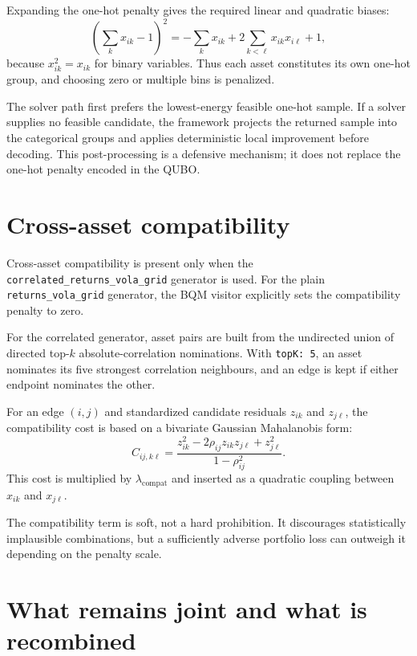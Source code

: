 \documentclass[11pt,a4paper]{article}
\begin{document}
Expanding the one-hot penalty gives the required linear and quadratic biases:
\begin{equation}
 \left(\sum_k x_{ik}-1\right)^2
 =-\sum_k x_{ik}+2\sum_{k<\ell}x_{ik}x_{i\ell}+1,
\end{equation}
because $x_{ik}^2=x_{ik}$ for binary variables. Thus each asset constitutes its
own one-hot group, and choosing zero or multiple bins is penalized.

The solver path first prefers the lowest-energy feasible one-hot sample. If a
solver supplies no feasible candidate, the framework projects the returned
sample into the categorical groups and applies deterministic local improvement
before decoding. This post-processing is a defensive mechanism; it does not
replace the one-hot penalty encoded in the QUBO.

\section{Cross-asset compatibility}

Cross-asset compatibility is present only when the
\texttt{correlated\_returns\_vola\_grid} generator is used. For the plain
\texttt{returns\_vola\_grid} generator, the BQM visitor explicitly sets the
compatibility penalty to zero.

For the correlated generator, asset pairs are built from the undirected union
of directed top-$k$ absolute-correlation nominations. With \texttt{topK: 5}, an
asset nominates its five strongest correlation neighbours, and an edge is kept
if either endpoint nominates the other.

For an edge $(i,j)$ and standardized candidate residuals $z_{ik}$ and
$z_{j\ell}$, the compatibility cost is based on a bivariate Gaussian
Mahalanobis form:
\begin{equation}
  C_{ij,k\ell}
  =\frac{z_{ik}^2-2\rho_{ij}z_{ik}z_{j\ell}+z_{j\ell}^2}
  {1-\rho_{ij}^2}.
\end{equation}
This cost is multiplied by $\lambda_{\mathrm{compat}}$ and inserted as a
quadratic coupling between $x_{ik}$ and $x_{j\ell}$.

The compatibility term is soft, not a hard prohibition. It discourages
statistically implausible combinations, but a sufficiently adverse portfolio
loss can outweigh it depending on the penalty scale.

\section{What remains joint and what is recombined}
\end{document}
